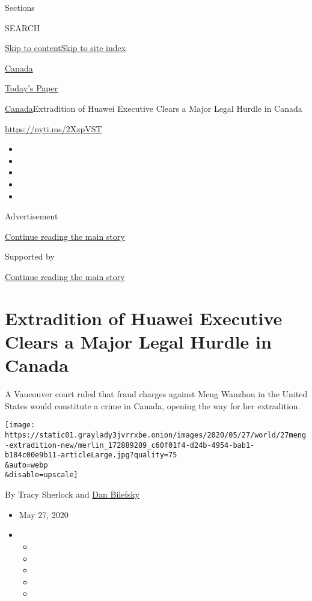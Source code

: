 Sections

SEARCH

\protect\hyperlink{site-content}{Skip to
content}\protect\hyperlink{site-index}{Skip to site index}

\href{https://www.nytimes3xbfgragh.onion/section/world/canada}{Canada}

\href{https://myaccount.nytimes3xbfgragh.onion/auth/login?response_type=cookie\&client_id=vi}{}

\href{https://www.nytimes3xbfgragh.onion/section/todayspaper}{Today's
Paper}

\href{/section/world/canada}{Canada}\textbar{}Extradition of Huawei
Executive Clears a Major Legal Hurdle in Canada

\url{https://nyti.ms/2XzpVST}

\begin{itemize}
\item
\item
\item
\item
\item
\end{itemize}

Advertisement

\protect\hyperlink{after-top}{Continue reading the main story}

Supported by

\protect\hyperlink{after-sponsor}{Continue reading the main story}

\hypertarget{extradition-of-huawei-executive-clears-a-major-legal-hurdle-in-canada}{%
\section{Extradition of Huawei Executive Clears a Major Legal Hurdle in
Canada}\label{extradition-of-huawei-executive-clears-a-major-legal-hurdle-in-canada}}

A Vancouver court ruled that fraud charges against Meng Wanzhou in the
United States would constitute a crime in Canada, opening the way for
her extradition.

\texttt{[image: https://static01.graylady3jvrrxbe.onion/images/2020/05/27/world/27meng-extradition-new/merlin\_172889289\_c60f01f4-d24b-4954-bab1-b184c00e9b11-articleLarge.jpg?quality=75\\\&auto=webp\\\&disable=upscale]}

By Tracy Sherlock and
\href{https://www.nytimes3xbfgragh.onion/by/dan-bilefsky}{Dan Bilefsky}

\begin{itemize}
\item
  May 27, 2020
\item
  \begin{itemize}
  \item
  \item
  \item
  \item
  \item
  \end{itemize}
\end{itemize}

